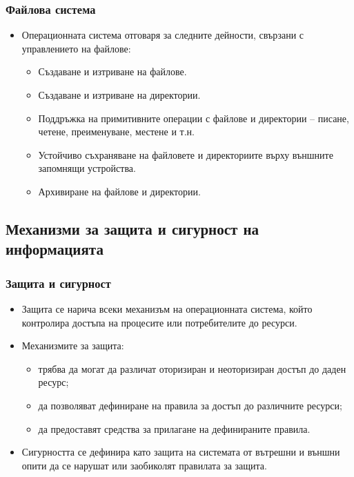\documentclass[ignorenonframetext, hyperref=unicode]{beamer}
\begin{document}
\begin{frame}
\frametitle{Файлова система}
\begin{itemize}
\item Операционната система отговаря за следните дейности, свързани с
управлението на файлове:
\begin{itemize}
  \item Създаване и изтриване на файлове.
  \item Създаване и изтриване на директории.
  \item Поддръжка на примитивните операции с файлове и директории -- писане,
  четене, преименуване, местене и т.н.
  \item Устойчиво съхраняване на файловете и директориите върху външните
  запомнящи устройства.
  \item Архивиране на файлове и директории.
\end{itemize}
\end{itemize}
\end{frame}

\subsection{Механизми за защита и сигурност на информацията}
\begin{frame}
\frametitle{Защита и сигурност}
\begin{itemize}
\item Защита се нарича всеки механизъм на операционната система, който контролира
достъпа на процесите или потребителите до ресурси.
\item Механизмите за защита:
\begin{itemize}
  \item трябва да могат да различат оторизиран и неоторизиран достъп до даден
  ресурс;
  \item да позволяват дефиниране на правила за достъп до различните ресурси;
  \item да предоставят средства за прилагане на дефинираните правила.
\end{itemize}
\item Сигурността се дефинира като защита на системата от вътрешни и външни
  опити да се нарушат или заобиколят правилата за защита.
\end{itemize}
\end{frame}
\end{document}
